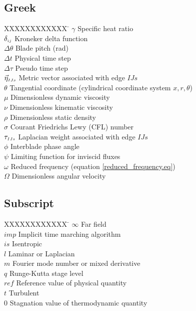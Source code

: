 \subsection*{Greek}
%
\begin{tabbing}
XXXXXXXXXXXX \= \kill
$\gamma$         \> Specific heat ratio\\
$\delta_{\mbox{\tiny $ij$}}$  \> Kroneker delta function\\
$\Delta \theta$  \> Blade pitch (rad)\\
$\Delta t$       \> Physical time step\\
$\Delta \tau$    \> Pseudo time step\\
$\vec{\eta}_{\mbox{\tiny $IJs$}}$ \> Metric vector associated with edge $IJs$\\
$\theta$         \> Tangential coordinate (cylindrical coordinate system $x, r, \theta$)\\
$\mu$            \> Dimensionless dynamic viscosity\\
$\nu$            \> Dimensionless kinematic viscosity\\
$\rho$           \> Dimensionless static density\\
$\sigma$         \> Courant Friedrichs Lewy (CFL) number\\
$\tau_{\mbox{\tiny $IJs$}}$   \> Laplacian weight associated with edge $IJs$\\
$\phi$           \> Interblade phase angle\\
$\psi$           \> Limiting function for inviscid fluxes\\
$\omega$         \> Reduced frequency (equation \ref{reduced_frequency.eq})\\
$\Omega$         \> Dimensionless angular velocity
\end{tabbing}
%
%
\subsection*{Subscript}
\begin{tabbing}
XXXXXXXXXXXX \= \kill
$\infty$         \> Far field\\
$imp$            \> Implicit time marching algorithm\\
$is$             \> Isentropic\\
$l$              \> Laminar or Laplacian\\
$m$              \> Fourier mode number or mixed derivative\\
$q$              \> Runge-Kutta stage level\\
$ref$            \> Reference value of physical quantity\\
$t$              \> Turbulent\\
$0$              \> Stagnation value of thermodynamic quantity\\
\end{tabbing}
%
%
